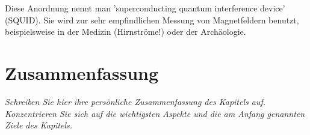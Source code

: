 Diese Anordnung nennt man 'superconducting quantum interference device' (SQUID). Sie wird zur sehr empfindlichen Messung von Magnetfeldern benutzt, beispielsweise in der Medizin (Hirnströme!) oder der Archäologie.


\newpage

\section{Zusammenfassung}

\textit{Schreiben Sie hier ihre persönliche Zusammenfassung des Kapitels auf. Konzentrieren Sie sich auf die wichtigsten Aspekte und die am Anfang genannten Ziele des Kapitels.}

\vspace*{10cm}
\printbibliography[segment=\therefsegment,heading=subbibliography]


